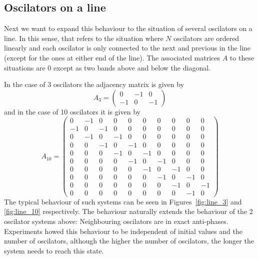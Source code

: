 \subsection{Oscilators on a line}

Next we want to expand this behaviour to the situation of several oscilators on a line. In this sense, that refers to the situation where $N$ oscilators are ordered linearly and each oscilator is only connected to the next and previous in the line (except for the ones at either end of the line). The associated matrices $A$ to these situations are $0$ except as two bands above and below the diagonal.  

In the case of 3 oscilators the adjacency matrix is given by
\[
  A_3 = \left( \begin{array}{ccc}
  0  & -1 &  0\\ 
  -1 &  0 & -1
  \end{array} \right)
\]
and in the case of 10 oscilators it is given by
\[
  A_{10} = \left( \begin{array}{cccccccccc}
  0 & -1 & 0 & 0 & 0 & 0 & 0 & 0 & 0 & 0 \\
  -1 & 0 & -1 & 0 & 0 & 0 & 0 & 0 & 0 & 0 \\
  0 & -1 & 0 & -1 & 0 & 0 & 0 & 0 & 0 & 0 \\
  0 & 0 & -1 & 0 & -1 & 0 & 0 & 0 & 0 & 0 \\
  0 & 0 & 0 & -1 & 0 & -1 & 0 & 0 & 0 & 0 \\
  0 & 0 & 0 & 0 & -1 & 0 & -1 & 0 & 0 & 0 \\
  0 & 0 & 0 & 0 & 0 & -1 & 0 & -1 & 0 & 0 \\
  0 & 0 & 0 & 0 & 0 & 0 & -1 & 0 & -1 & 0 \\
  0 & 0 & 0 & 0 & 0 & 0 & 0 & -1 & 0 & -1 \\
  0 & 0 & 0 & 0 & 0 & 0 & 0 & 0 & -1 & 0
  \end{array} \right)
\]
The typical behaviour of such systems can be seen in Figures~\ref{fig:line_3} and \ref{fig:line_10} respectively. The behaviour naturally extends the behaviour of the 2 oscilator systems above: Neighbouring oscilators are in exact anti-phases. Experiments howed this behaviour to be independent of initial values and the number of oscilators, although the higher the number of oscilators, the longer the system needs to reach this state. 

